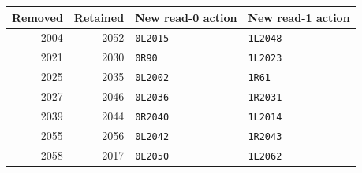 \begin{center}\small
\begin{tabular}{@{}rrll@{}}\toprule
Removed & Retained & New read-0 action & New read-1 action\\\midrule
2004 & 2052 & \texttt{0L2015} & \texttt{1L2048}\\
2021 & 2030 & \texttt{0R90} & \texttt{1L2023}\\
2025 & 2035 & \texttt{0L2002} & \texttt{1R61}\\
2027 & 2046 & \texttt{0L2036} & \texttt{1R2031}\\
2039 & 2044 & \texttt{0R2040} & \texttt{1L2014}\\
2055 & 2056 & \texttt{0L2042} & \texttt{1R2043}\\
2058 & 2017 & \texttt{0L2050} & \texttt{1L2062}\\
\bottomrule\end{tabular}\end{center}
